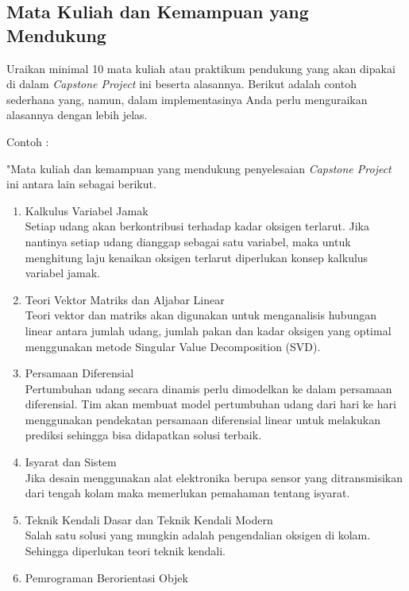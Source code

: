     \subsection{Mata Kuliah dan Kemampuan yang Mendukung} \label{subsec:Mata_Kuliah_dan_Kemampuan_yang_Mendukung}

    Uraikan minimal 10 mata kuliah atau praktikum pendukung yang akan dipakai di dalam \textit{Capstone Project} ini beserta alasannya. Berikut adalah contoh sederhana yang, namun, dalam implementasinya Anda perlu menguraikan alasannya dengan lebih jelas.
    \vspace{6pt}
    
    \noindent
    Contoh :

    "Mata kuliah dan kemampuan yang mendukung penyelesaian \textit{Capstone Project} ini antara lain sebagai berikut.
    \begin{enumerate}[label=\alph*.]
        \item Kalkulus Variabel Jamak\\
        Setiap udang akan berkontribusi terhadap kadar oksigen terlarut. Jika nantinya setiap udang dianggap sebagai satu variabel, maka untuk menghitung laju kenaikan oksigen terlarut diperlukan konsep kalkulus variabel jamak.
        \item Teori Vektor Matriks dan Aljabar Linear\\ 
        Teori vektor dan matriks akan digunakan untuk menganalisis hubungan linear antara jumlah udang, jumlah pakan dan kadar oksigen yang optimal menggunakan metode Singular Value Decomposition (SVD).
        \item Persamaan Diferensial\\
        Pertumbuhan udang secara dinamis perlu dimodelkan ke dalam persamaan diferensial. Tim akan membuat model pertumbuhan udang dari hari ke hari menggunakan pendekatan persamaan diferensial linear untuk melakukan prediksi sehingga bisa didapatkan solusi terbaik.
        \item Isyarat dan Sistem\\
        Jika desain menggunakan alat elektronika berupa sensor yang ditransmisikan dari tengah kolam maka memerlukan pemahaman tentang isyarat.
        \item Teknik Kendali Dasar dan Teknik Kendali Modern\\
        Salah satu solusi yang mungkin adalah pengendalian oksigen di kolam. Sehingga diperlukan teori teknik kendali.
        \item Pemrograman Berorientasi Objek\\ 

\end{enumerate}
